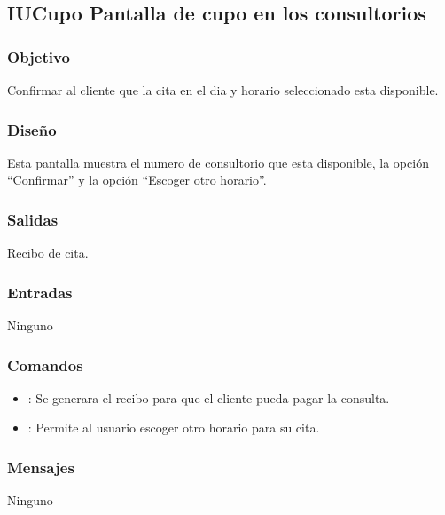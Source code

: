 \subsection{IUCupo Pantalla de cupo en los consultorios}

\subsubsection{Objetivo}
	Confirmar al cliente que la cita en el d\´ia y horario seleccionado esta disponible.

\subsubsection{Diseño}
	Esta pantalla muestra el numero de consultorio que esta disponible, la opci\'on "`Confirmar"' y la opci\'on "`Escoger otro horario"'.

    
\subsubsection{Salidas}
    Recibo de cita.

\subsubsection{Entradas}
	Ninguno

\subsubsection{Comandos}
\begin{itemize}
		\item {}: Se generara el recibo para que el cliente pueda pagar la consulta.
		\item {}: Permite al usuario escoger otro horario para su cita.
\end{itemize}

\subsubsection{Mensajes}
	Ninguno
